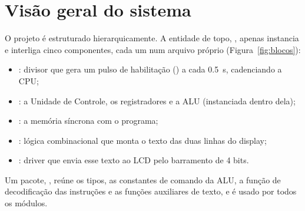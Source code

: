 \section{Visão geral do sistema}
\label{sec:visao}

O projeto é estruturado hierarquicamente. A entidade de topo, ,
apenas instancia e interliga cinco componentes, cada um num arquivo próprio
(Figura~\ref{fig:blocos}):

\begin{itemize}[nosep]
  \item {}: divisor que gera um pulso de habilitação ()
        a cada \SI{0,5}{\second}, cadenciando a CPU;
  \item {}: a Unidade de Controle, os registradores e a ALU (instanciada
        dentro dela);
  \item {}: a memória síncrona com o programa;
  \item {}: lógica combinacional que monta o texto das duas linhas
        do display;
  \item {}: driver que envia esse texto ao LCD pelo
        barramento de 4 bits.
\end{itemize}

Um pacote, , reúne os tipos, as constantes de comando da ALU, a
função de decodificação das instruções e as funções auxiliares de texto, e é
usado por todos os módulos.

